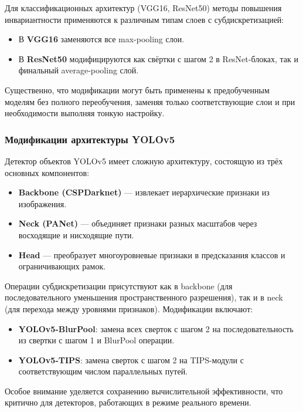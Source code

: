 Для классификационных архитектур (VGG16, ResNet50) методы повышения инвариантности применяются к различным типам слоев с субдискретизацией:

\begin{itemize}
    \item В \textbf{VGG16} заменяются все max-pooling слои.
    \item В \textbf{ResNet50} модифицируются как свёртки с шагом 2 в ResNet-блоках, так и финальный average-pooling слой.
\end{itemize}

Существенно, что модификации могут быть применены к предобученным моделям без полного переобучения, заменяя только соответствующие слои и при необходимости выполняя тонкую настройку.

\subsubsection{Модификации архитектуры YOLOv5}
\label{sec:architectures:yolo}

Детектор объектов YOLOv5 имеет сложную архитектуру, состоящую из трёх основных компонентов:

\begin{itemize}
    \item \textbf{Backbone (CSPDarknet)} — извлекает иерархические признаки из изображения.
    \item \textbf{Neck (PANet)} — объединяет признаки разных масштабов через восходящие и нисходящие пути.
    \item \textbf{Head} — преобразует многоуровневые признаки в предсказания классов и ограничивающих рамок.
\end{itemize}

Операции субдискретизации присутствуют как в backbone (для последовательного уменьшения пространственного разрешения), так и в neck (для перехода между уровнями признаков). Модификации включают:

\begin{itemize}
    \item \textbf{YOLOv5-BlurPool}: замена всех сверток с шагом 2 на последовательность из свертки с шагом 1 и BlurPool операции.
    \item \textbf{YOLOv5-TIPS}: замена сверток с шагом 2 на TIPS-модули с соответствующим числом параллельных путей.
\end{itemize}

Особое внимание уделяется сохранению вычислительной эффективности, что критично для детекторов, работающих в режиме реального времени.

